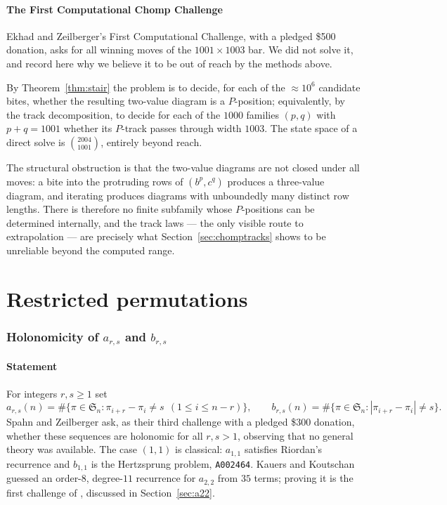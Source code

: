 \documentclass[11pt]{article}
\theoremstyle{definition}
\newcommand{\Sn}{\mathfrak{S}_n}
\begin{document}
\subsection{The First Computational Chomp Challenge}

Ekhad and Zeilberger's First Computational Challenge, with a pledged \$500
donation, asks for all winning moves of the $1001\times1003$ bar. We did not
solve it, and record here why we believe it to be out of reach by the methods
above.

By Theorem~\ref{thm:stair} the problem is to decide, for each of the
$\approx10^{6}$ candidate bites, whether the resulting two-value diagram is a
$P$-position; equivalently, by the track decomposition, to decide for each of
the $1000$ families $(p,q)$ with $p+q=1001$ whether its $P$-track passes
through width $1003$. The state space of a direct solve is
$\binom{2004}{1001}$, entirely beyond reach.

The structural obstruction is that the two-value diagrams are not closed under
all moves: a bite into the protruding rows of $(b^p,c^q)$ produces a
three-value diagram, and iterating produces diagrams with unboundedly many
distinct row lengths. There is therefore no finite subfamily whose
$P$-positions can be determined internally, and the track laws --- the only
visible route to extrapolation --- are precisely what
Section~\ref{sec:chomptracks} shows to be unreliable beyond the computed range.

\part{Restricted permutations}

\section{Holonomicity of $a_{r,s}$ and $b_{r,s}$}\label{sec:ch3}

\subsection{Statement}

For integers $r,s\ge 1$ set
\[
  a_{r,s}(n)=\#\{\pi\in\Sn:\pi_{i+r}-\pi_i\ne s\ \ (1\le i\le n-r)\},
  \qquad
  b_{r,s}(n)=\#\{\pi\in\Sn:|\pi_{i+r}-\pi_i|\ne s\}.
\]
Spahn and Zeilberger \cite{SZ} ask, as their third challenge with a pledged
\$300 donation, whether these sequences are holonomic for all $r,s>1$,
observing that no general theory was available. The case $(1,1)$ is classical:
$a_{1,1}$ satisfies Riordan's recurrence and $b_{1,1}$ is the Hertzsprung
problem, \texttt{A002464}. Kauers and Koutschan \cite{KK} guessed an order-$8$,
degree-$11$ recurrence for $a_{2,2}$ from $35$ terms; proving it is the first
challenge of \cite{SZ}, discussed in Section~\ref{sec:a22}.
\end{document}
